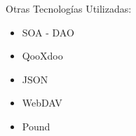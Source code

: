 \begin{frame}{Otras Tecnologías Utilizadas:\newline}
\begin{itemize}
	
	\pause \item SOA - DAO
	\pause \item QooXdoo
	\pause \item JSON
	\pause \item WebDAV
	\pause \item Pound
	
\end{itemize}
\end{frame}
